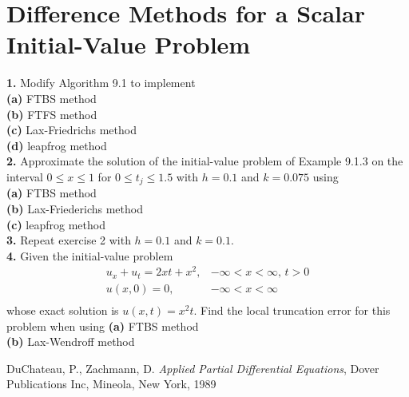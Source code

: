 \documentclass{amsbook}%
\theoremstyle{plain}
\numberwithin{equation}{section}
\begin{document}
	\section{Difference Methods for a Scalar Initial-Value Problem}

		\noindent\textbf{1.} Modify Algorithm 9.1 to implement\\
		\textbf{(a)} FTBS method\\
		\textbf{(b)} FTFS method\\
		\textbf{(c)} Lax-Friedrichs method\\
		\textbf{(d)} leapfrog method\\[12pt]
		
		\noindent\textbf{2.} Approximate the solution of the initial-value problem of Example 9.1.3 on the interval $0\leq x\leq 1$ for $0\leq t_j\leq 1.5$ with $h=0.1$ and $k=0.075$ using\\
		\textbf{(a)} FTBS method\\
		\textbf{(b)} Lax-Friederichs method\\
		\textbf{(c)} leapfrog method\\[12pt]
		
		\noindent\textbf{3.} Repeat exercise 2 with $h=0.1$ and $k=0.1$.\\[12pt]
		
		\noindent\textbf{4.} Given the initial-value problem 
		\begin{align}
			u_x+u_t=2xt+x^2, & -\infty<x<\infty,\, t>0\\
			u(x,0)=0, & -\infty<x<\infty\\
		\end{align}
		whose exact solution is $u(x,t)=x^2t$. Find the local truncation error for this problem when using
		\textbf{(a)} FTBS method\\
		\textbf{(b)} Lax-Wendroff method\\[12pt]	

\backmatter

\begin{thebibliography}{9}
DuChateau, P., Zachmann, D. \textit{Applied Partial Differential Equations}, Dover Publications Inc,
Mineola, New York, 1989

\end{thebibliography}
\end{document}
